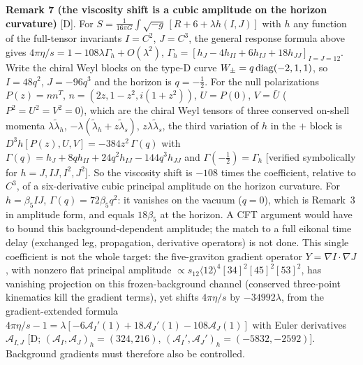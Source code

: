 \textbf{Remark 7 (the viscosity shift is a cubic amplitude on the horizon curvature)} [D]. For $S=\frac1{16\pi G}\int\sqrt{-g}\,[R+6+\lambda h(I,J)]$
with $h$ any function of the full-tensor invariants $I=C^2$, $J=C^3$, the general response formula above gives
$4\pi\eta/s=1-108\lambda\Gamma_h+O(\lambda^2)$, $\Gamma_h=[h_J-4h_{II}+6h_{IJ}+18h_{JJ}]_{I=J=12}$. Write the chiral Weyl blocks on the type-D curve
$W_\pm=q\,{\rm diag}(-2,1,1)$, so $I=48q^2$, $J=-96q^3$ and the horizon is $q=-\tfrac12$. For the null polarizations $P(z)=nn^T$,
$n=(2z,1-z^2,i(1+z^2))$, $U=P(0)$, $V=\bar U$ ($P^2=U^2=V^2=0$), which are the chiral Weyl tensors of three conserved on-shell momenta
$\lambda\tilde\lambda_h$, $-\lambda(\tilde\lambda_h+z\tilde\lambda_s)$, $z\lambda\tilde\lambda_s$, the third variation of $h$ in the $+$ block is
$D^3h[P(z),U,V]=-384z^2\,\Gamma(q)$ with $\Gamma(q)=h_J+8qh_{II}+24q^2h_{IJ}-144q^3h_{JJ}$ and $\Gamma(-\tfrac12)=\Gamma_h$ [verified symbolically for
$h=J,IJ,I^2,J^2$]. So the viscosity shift is $-108$ times the coefficient, relative to $C^3$, of a six-derivative cubic principal amplitude on the
horizon curvature. For $h=\beta_5IJ$, $\Gamma(q)=72\beta_5q^2$: it vanishes on the vacuum ($q=0$), which is Remark~3 in amplitude form, and equals
$18\beta_5$ at the horizon. A CFT argument would have to bound this background-dependent amplitude; the match to a full eikonal time delay
(exchanged leg, propagation, derivative operators) is not done. This single coefficient is not the whole target: the five-graviton gradient operator $Y=\nabla I\cdot\nabla J$, with
nonzero flat principal amplitude $\propto s_{12}\langle12\rangle^4[34]^2[45]^2[53]^2$, has vanishing projection on this frozen-background
channel (conserved three-point kinematics kill the gradient terms), yet shifts $4\pi\eta/s$ by $-34992\lambda$, from the gradient-extended formula
$4\pi\eta/s-1=\lambda[-6\mathcal A_I'(1)+18\mathcal A_J'(1)-108\mathcal A_J(1)]$ with Euler derivatives $\mathcal A_{I,J}$ [D; $(\mathcal A_I,\mathcal A_J)_h=(324,216)$,
$(\mathcal A_I',\mathcal A_J')_h=(-5832,-2592)$]. Background gradients must therefore also be controlled.

